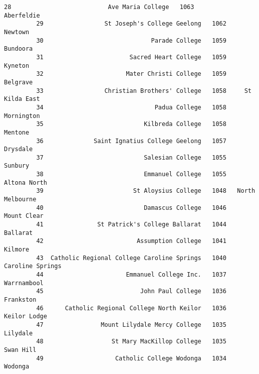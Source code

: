 \documentclass[11pt]{article}
\begin{document}
\begin{Verbatim}[commandchars=\\\{\}]
         28                           Ave Maria College   1063        Aberfeldie   
         29                 St Joseph's College Geelong   1062           Newtown   
         30                              Parade College   1059          Bundoora   
         31                        Sacred Heart College   1059           Kyneton   
         32                       Mater Christi College   1059          Belgrave   
         33                 Christian Brothers' College   1058     St Kilda East   
         34                               Padua College   1058        Mornington   
         35                            Kilbreda College   1058           Mentone   
         36              Saint Ignatius College Geelong   1057          Drysdale   
         37                            Salesian College   1055           Sunbury   
         38                            Emmanuel College   1055      Altona North   
         39                         St Aloysius College   1048   North Melbourne   
         40                            Damascus College   1046       Mount Clear   
         41               St Patrick's College Ballarat   1044          Ballarat   
         42                          Assumption College   1041           Kilmore   
         43  Catholic Regional College Caroline Springs   1040  Caroline Springs   
         44                       Emmanuel College Inc.   1037       Warrnambool   
         45                           John Paul College   1036         Frankston   
         46      Catholic Regional College North Keilor   1036      Keilor Lodge   
         47                Mount Lilydale Mercy College   1035          Lilydale   
         48                   St Mary MacKillop College   1035         Swan Hill   
         49                    Catholic College Wodonga   1034           Wodonga   
         

\end{Verbatim}
\end{document}
